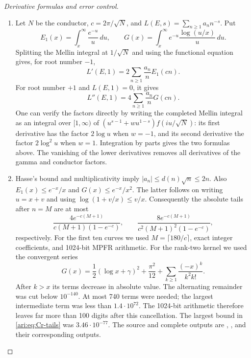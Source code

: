 \begin{proof}[Derivative formulas and error control]

\begin{enumerate}[label=\arabic*.,leftmargin=*]
\item Let $N$ be the conductor, $c=2\pi/\sqrt N$, and
$L(E,s)=\sum_{n\geq1}a_nn^{-s}$. Put
\[
 E_1(x)=\int_x^\infty\frac{e^{-u}}u\,du,
 \qquad G(x)=\int_x^\infty e^{-u}\frac{\log(u/x)}u\,du.
\]
Splitting the Mellin integral at $1/\sqrt N$ and using the functional
equation gives, for root number $-1$,
\begin{equation}\label{ari:eq:Cr-first}
 L'(E,1)=2\sum_{n\geq1}\frac{a_n}{n}E_1(cn).
\end{equation}
For root number $+1$ and $L(E,1)=0$, it gives
\begin{equation}\label{ari:eq:Cr-second}
 L''(E,1)=4\sum_{n\geq1}\frac{a_n}{n}G(cn).
\end{equation}
One can verify the factors directly by writing the completed Mellin
integral as an integral over $[1,\infty)$ of
$(u^{s-1}+wu^{1-s})f(iu/\sqrt N)$: its first derivative has
the factor $2\log u$ when $w=-1$, and its second derivative
the factor $2\log^2u$ when $w=1$. Integration by parts gives
the two formulas above. The vanishing of the lower derivatives
removes all derivatives of the gamma and conductor factors.

\item Hasse's bound and multiplicativity imply
$|a_n|\leq d(n)\sqrt n\leq2n$. Also
$E_1(x)\leq e^{-x}/x$ and $G(x)\leq e^{-x}/x^2$.
The latter follows on writing $u=x+v$ and using
$\log(1+v/x)\leq v/x$. Consequently the absolute tails after
$n=M$ are at most
\begin{equation}\label{ari:eq:Cr-tails}
 \frac{4e^{-c(M+1)}}{c(M+1)(1-e^{-c})},\qquad
 \frac{8e^{-c(M+1)}}{c^2(M+1)^2(1-e^{-c})},
\end{equation}
respectively. For the first ten curves we used
$M=\lceil180/c\rceil$, exact integer coefficients, and 1024-bit
MPFR arithmetic. For the rank-two kernel we used the convergent series
\[
 G(x)=\frac12(\log x+\gamma)^2+\frac{\pi^2}{12}
       +\sum_{k\geq1}\frac{(-x)^k}{k^2k!}.
\]
After $k>x$ its terms decrease in absolute value. The alternating
remainder was cut below $10^{-140}$. At most 740 terms were needed;
the largest intermediate term was less than $1.4\cdot10^{72}$.
The 1024-bit arithmetic therefore leaves far more than 100 digits
after this cancellation. The largest bound in
\eqref{ari:eq:Cr-tails} was $3.46\cdot10^{-77}$. The source and complete
outputs are ,
, and their corresponding outputs.


\end{enumerate}
\end{proof}
